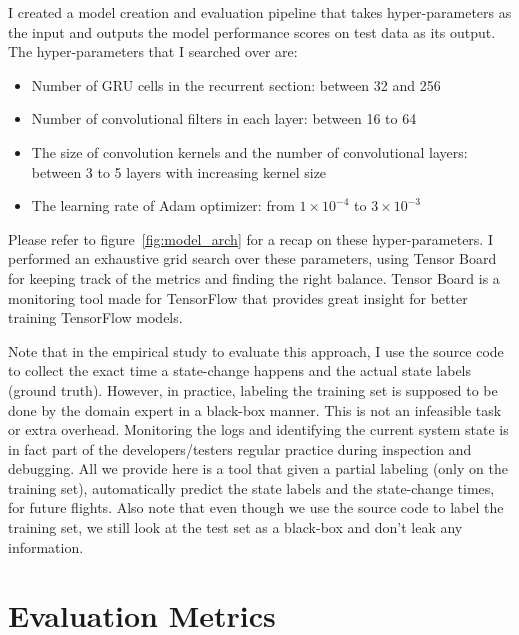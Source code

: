 I created a model creation and evaluation pipeline that takes hyper-parameters as the input and outputs the model performance scores on test data as its output. The hyper-parameters that I searched over are:
\begin{itemize}
    \item Number of GRU cells in the recurrent section: between 32 and 256
    \item Number of convolutional filters in each layer: between 16 to 64
    \item The size of convolution kernels and the number of convolutional layers: between 3 to 5 layers with increasing kernel size
    \item The learning rate of Adam optimizer: from $1\times 10^{-4}$ to $3\times10^{-3}$
\end{itemize}
Please refer to figure~\ref{fig:model_arch} for a recap on these hyper-parameters. 
I performed an exhaustive grid search over these parameters, using Tensor Board for keeping track of the metrics and finding the right balance.
Tensor Board is a monitoring tool made for TensorFlow \cite{tensorflow2015-whitepaper} that provides great insight for better training TensorFlow models.


Note that in the empirical study to evaluate this approach, I use the source code to collect the exact time a state-change happens and the actual state labels (ground truth). However, in practice, labeling the training set is supposed to be done by the domain expert in a black-box manner. This is not an infeasible task or extra overhead. Monitoring the logs and identifying the current system state is in fact part of the developers/testers regular practice during inspection and debugging. All we provide here is a tool that given a partial labeling (only on the training set), automatically predict the state labels and the state-change times, for future flights.  Also note that even though we use the source code to label the training set, we still look at the test set as a black-box and don't leak any information.

\section{Evaluation Metrics}

